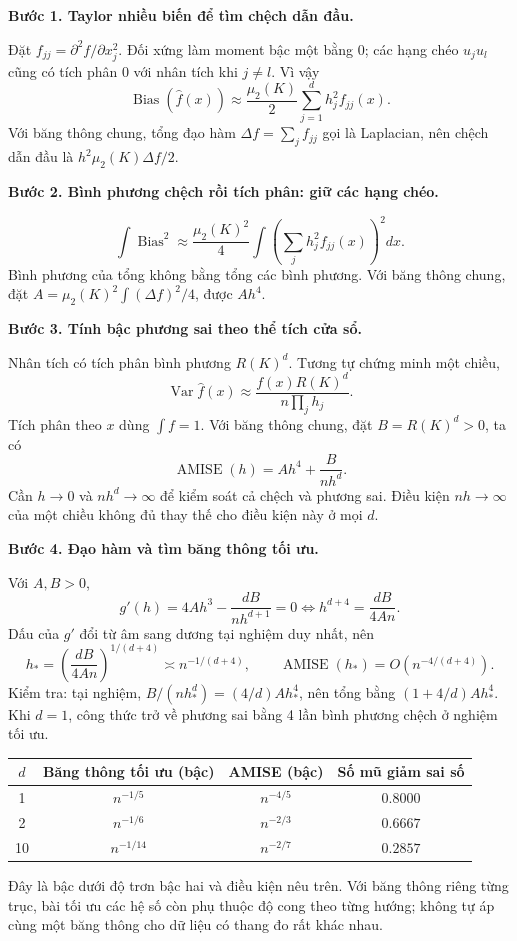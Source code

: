 \documentclass[11pt,a4paper]{article}
\DeclareMathOperator{\AMISE}{AMISE}
\DeclareMathOperator{\Var}{Var}
\DeclareMathOperator{\Bias}{Bias}
\newcommand{\buoc}[1]{\par\medskip\textbf{#1}\par}
\begin{document}
\buoc{Bước 1. Taylor nhiều biến để tìm chệch dẫn đầu.}
Đặt $f_{jj}=\partial^2 f/\partial x_j^2$. Đối xứng làm moment bậc một bằng 0; các hạng chéo $u_ju_l$ cũng có tích phân 0 với nhân tích khi $j\ne l$. Vì vậy
\[
\Bias(\widehat f(x))\approx\frac{\mu_2(K)}2\sum_{j=1}^dh_j^2f_{jj}(x).
\]
Với băng thông chung, tổng đạo hàm $\Delta f=\sum_jf_{jj}$ gọi là Laplacian, nên chệch dẫn đầu là $h^2\mu_2(K)\Delta f/2$.

\buoc{Bước 2. Bình phương chệch rồi tích phân: giữ các hạng chéo.}
\[
\int\Bias^2\approx\frac{\mu_2(K)^2}{4}
\int\left(\sum_jh_j^2f_{jj}(x)\right)^2dx.
\]
Bình phương của tổng không bằng tổng các bình phương. Với băng thông chung, đặt
$A=\mu_2(K)^2\int(\Delta f)^2/4$, được $Ah^4$.

\buoc{Bước 3. Tính bậc phương sai theo thể tích cửa sổ.}
Nhân tích có tích phân bình phương $R(K)^d$. Tương tự chứng minh một chiều,
\[
\Var\widehat f(x)\approx\frac{f(x)R(K)^d}{n\prod_jh_j}.
\]
Tích phân theo $x$ dùng $\int f=1$. Với băng thông chung, đặt $B=R(K)^d>0$, ta có
\[
\boxed{\AMISE(h)=Ah^4+\frac{B}{nh^d}.}
\]
Cần $h\to0$ và $nh^d\to\infty$ để kiểm soát cả chệch và phương sai. Điều kiện $nh\to\infty$ của một chiều không đủ thay thế cho điều kiện này ở mọi $d$.

\buoc{Bước 4. Đạo hàm và tìm băng thông tối ưu.}
Với $A,B>0$,
\[
g'(h)=4Ah^3-\frac{dB}{nh^{d+1}}=0
\Longleftrightarrow h^{d+4}=\frac{dB}{4An}.
\]
Dấu của $g'$ đổi từ âm sang dương tại nghiệm duy nhất, nên
\[
\boxed{h_* =\left(\frac{dB}{4An}\right)^{1/(d+4)}\asymp n^{-1/(d+4)},
\qquad\AMISE(h_*)=O(n^{-4/(d+4)}).}
\]
Kiểm tra: tại nghiệm, $B/(nh_*^d)=(4/d)Ah_*^4$, nên tổng bằng $(1+4/d)Ah_*^4$. Khi $d=1$, công thức trở về phương sai bằng 4 lần bình phương chệch ở nghiệm tối ưu.

\begin{center}
\begin{tabular}{cccc}
\toprule
$d$ & Băng thông tối ưu (bậc) & AMISE (bậc) & Số mũ giảm sai số\\
\midrule
1&$n^{-1/5}$&$n^{-4/5}$&$0.8000$\\
2&$n^{-1/6}$&$n^{-2/3}$&$0.6667$\\
10&$n^{-1/14}$&$n^{-2/7}$&$0.2857$\\
\bottomrule
\end{tabular}
\end{center}
Đây là bậc dưới độ trơn bậc hai và điều kiện nêu trên. Với băng thông riêng từng trục, bài tối ưu các hệ số còn phụ thuộc độ cong theo từng hướng; không tự áp cùng một băng thông cho dữ liệu có thang đo rất khác nhau.
\end{document}
